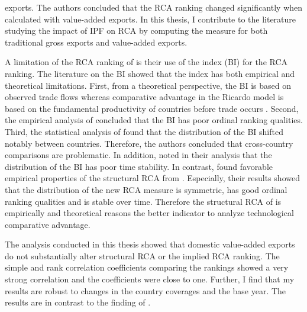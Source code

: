 exports. The authors concluded that the RCA ranking changed significantly when calculated with value-added exports.  In this thesis, I contribute to the literature studying the impact of IPF on RCA  by computing the \textcite{costinot} measure for both traditional gross exports and value-added exports.
\par %
A limitation of the RCA ranking of  \textcite{Koopman} is their use of the \textcite{Balassa} index (BI) for the RCA ranking. The literature on the BI showed that the index has both empirical and theoretical limitations.
 First, from a theoretical perspective, the BI is based on observed trade flows whereas comparative advantage in the Ricardo model is based on the fundamental productivity of countries before trade occurs \parencite{Leromain}.  Second, the empirical analysis of \textcite{yeats} concluded that the BI has poor ordinal ranking qualities. Third, the statistical analysis of \textcite{hinloopen2001} found that the distribution of the BI shifted notably between countries. Therefore, the authors concluded
that cross-country comparisons are problematic.  In addition, \textcite{Leromain} noted in their analysis that the distribution of the BI has poor time stability. In contrast, 
\textcite{Leromain} found favorable empirical properties of the structural RCA from \textcite{costinot}. Especially, their results showed that the distribution of the new RCA measure is symmetric, has good ordinal ranking qualities and is stable over time.  Therefore the structural RCA of \textcite{costinot} is empirically and theoretical reasons the better indicator to analyze technological comparative advantage.    \par
The analysis conducted in this thesis showed that domestic value-added exports do not substantially alter structural RCA or the implied RCA ranking. The simple and rank correlation coefficients comparing the rankings showed a very strong correlation and the coefficients were close to one. Further, I find that my results are robust to changes in the country coverages and the base year. The results are in contrast to the finding of \textcite{Koopman}. \par
